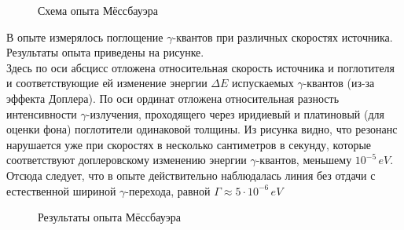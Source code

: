 \documentclass{article}
\begin{document}
\begin{figure}[h]
\caption{Схема опыта Мёссбауэра}
\label{fig:image}
\end{figure}

\indent В опыте измерялось поглощение $\gamma$-квантов при различных скоростях источника. Результаты опыта приведены на рисунке.
\\
\indent Здесь по оси абсцисс отложена относительная скорость источника и поглотителя и соответствующие ей изменение энергии $\Delta E$ испускаемых $\gamma$-квантов (из-за эффекта Доплера). По оси ординат отложена относительная разность интенсивности $\gamma$-излучения, проходящего через иридиевый и платиновый (для оценки фона) поглотители одинаковой толщины. Из рисунка видно, что резонанс нарушается уже при скоростях в несколько сантиметров в секунду, которые соответствуют доплеровскому изменению энергии $\gamma$-квантов, меньшему $10^{-5} \hspace{2pt}eV$. Отсюда следует, что в опыте действительно наблюдалась линия без отдачи с естественной шириной ${\gamma}$-перехода, равной $\Gamma \approx 5\cdot 10^{-6} \hspace{2pt} eV$

\begin{figure}[h]
\caption{Результаты опыта Мёссбауэра}
\label{fig:image}
\end{figure}
\end{document}
